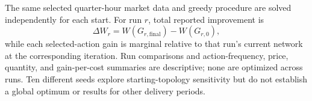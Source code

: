 \documentclass[11pt]{article}
\begin{document}
The same selected quarter-hour market data and greedy procedure are solved
independently for each start. For run \(r\), total reported improvement is
\[
\Delta W_r=W(G_{r,\mathrm{final}})-W(G_{r,0}),
\]
while each selected-action gain is marginal relative to that run's current
network at the corresponding iteration. Run comparisons and action-frequency,
price, quantity, and gain-per-cost summaries are descriptive; none are optimized
across runs. Ten different seeds explore starting-topology sensitivity but do
not establish a global optimum or results for other delivery periods.
\end{document}
